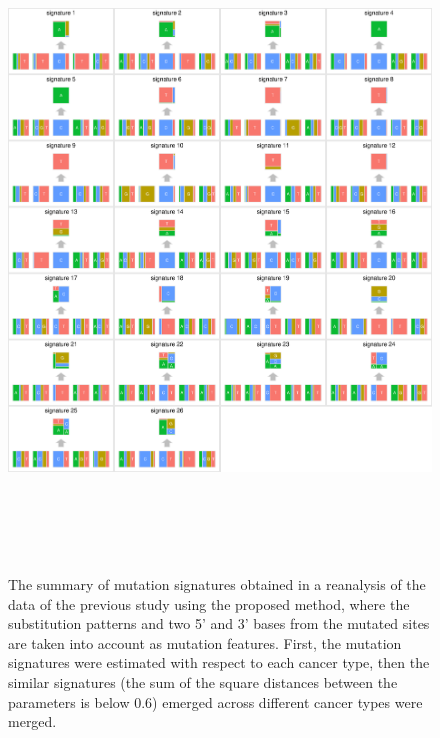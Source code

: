 \begin{figure}[b]
\centering
\includegraphics[width=16cm,height=17.5cm]{AlexandrovEtAl_mergedSignature.eps}
\caption{The summary of mutation signatures obtained in a reanalysis of the data of the previous study \cite{pmid23945592} using the proposed method,
where the substitution patterns and two 5' and 3' bases from the mutated sites are taken into account as mutation features.
First, the mutation signatures were estimated with respect to each cancer type,
then the similar signatures (the sum of the square distances between the parameters is below 0.6) emerged across different cancer types were merged.
}
\label{nature2013_sig_summary}
\end{figure}

\clearpage

